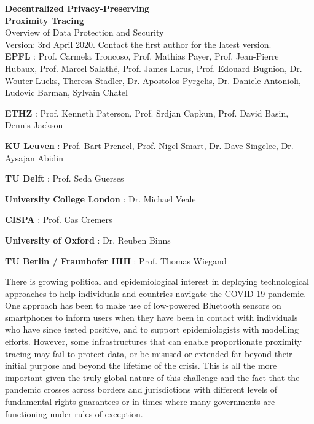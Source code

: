 \documentclass[12pt,a4paper]{article}
\begin{document}
\pagebreak
\begin{center}{\Large{\bfseries
Decentralized Privacy-Preserving\\
Proximity Tracing}\\[0.5cm]
Overview of Data Protection and Security}\\
Version: 3rd April 2020. Contact the first author for the latest version.\\[1cm]


\textbf{EPFL} : Prof. Carmela Troncoso, Prof. Mathias Payer, Prof. Jean-Pierre\\
Hubaux, Prof. Marcel Salathé, Prof. James Larus, Prof. Edouard
Bugnion, Dr. Wouter Lueks, Theresa Stadler, Dr. Apostolos Pyrgelis, Dr.
Daniele Antonioli, Ludovic Barman, Sylvain Chatel


\textbf{ETHZ} : Prof. Kenneth Paterson, Prof. Srdjan Capkun, Prof. David Basin,
Dennis Jackson


\textbf{KU Leuven} : Prof. Bart Preneel, Prof. Nigel Smart, Dr. Dave Singelee,
Dr. Aysajan Abidin


\textbf{TU Delft} : Prof. Seda Guerses


\textbf{University College London} : Dr. Michael Veale


\textbf{CISPA} : Prof. Cas Cremers


\textbf{University of Oxford} : Dr. Reuben Binns


\textbf{TU Berlin / Fraunhofer HHI} : Prof. Thomas Wiegand
\end{center}
\clearpage
\singlespace \noindent
There is growing political and epidemiological interest in deploying technological approaches to help individuals and countries navigate the COVID-19 pandemic. One approach has been to make use of low-powered Bluetooth sensors on smartphones to inform users when they have been in contact with individuals who have since tested positive, and to support
epidemiologists with modelling efforts. However, some infrastructures that can enable
proportionate proximity tracing may fail to protect data, or be misused or extended far
beyond their initial purpose and beyond the lifetime of the crisis. This is all the more
important given the truly global nature of this challenge and the fact that the pandemic
crosses across borders and jurisdictions with different levels of fundamental rights
guarantees or in times where many governments are functioning under rules of exception.
\end{document}
